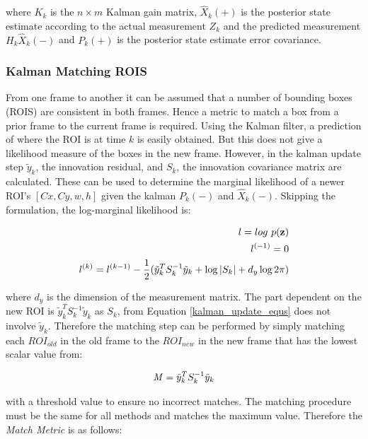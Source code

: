 \documentclass[11pt,twoside]{report}
\begin{document}
where $K_{k}$ is the $n \times m$ Kalman gain matrix, $\hat{X}_{k}(+)$ is the posterior state estimate according to the actual measurement $Z_{k}$ and the predicted measurement $H_{k} \hat{X}_{k}(-)$ and $P_{k}(+)$ is the posterior state estimate error covariance.

\subsubsection{Kalman Matching ROIS}

From one frame to another it can be assumed that a number of bounding boxes (ROIS) are consistent in both frames. Hence a metric to match a box from a prior frame to the current frame is required. Using the Kalman filter, a prediction of where the ROI is at time $k$ is easily obtained. But this does not give a likelihood measure of the boxes in the new frame. However, in the kalman update step $\tilde{y}_{k}$, the innovation residual, and $S_{k}$, the innovation covariance matrix are calculated. These can be used to determine the marginal likelihood of a newer ROI's $[Cx,Cy,w,h]$ given the kalman $P_{k}(-)$ and $\hat{X}_{k}(-)$. Skipping the formulation, the log-marginal likelihood is:

\begin{equation}
\begin{aligned}
l = log \textnormal{ } p(\mathbf{z}) \\
l^{(-1)} = 0 \\
l^{(k)} = l^{(k-1)} - \frac{1}{2} (\tilde{y}_{k}^{T}S_{k}^{-1}\tilde{y}_{k} + \log |S_{k}| + d_{y}\log 2 \pi) 
\end{aligned}
\end{equation}

where $d_{y}$ is the dimension of the measurement matrix. The part dependent on the new ROI is $\tilde{y}_{k}^{T}S_{k}^{-1}\tilde{y}_{k}$ as $S_{k}$, from Equation \ref{kalman_update_equs} does not involve $\tilde{y}_{k}$. Therefore the matching step can be performed by simply matching each $ROI_{old}$ in the old frame to the $ROI_{new}$ in the new frame that has the lowest scalar value from:

\begin{equation}
\begin{aligned}
\textnormal{\textit{M}} = \tilde{y}_{k}^{T}S_{k}^{-1}\tilde{y}_{k}
\end{aligned}
\end{equation}

with a threshold value to ensure no incorrect matches. The matching procedure must be the same for all methods and matches the maximum value. Therefore the \textit{Match Metric} is as follows:
\end{document}
